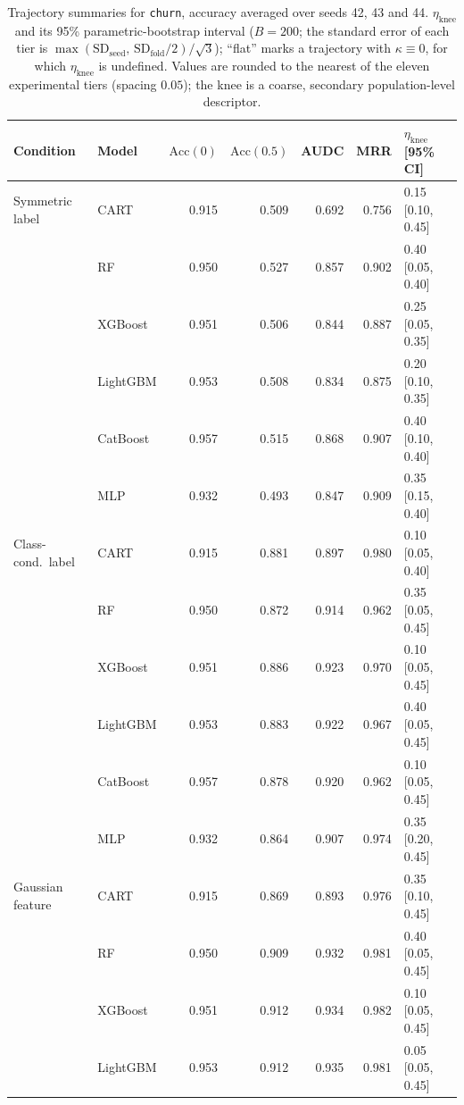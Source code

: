 \documentclass[pdflatex,sn-mathphys]{sn-jnl}
\theoremstyle{thmstyleone}
\begin{document}
\begin{table}[htbp]
\centering
\scriptsize
\setlength{\tabcolsep}{3.5pt}
\caption{Trajectory summaries for \texttt{churn}, accuracy averaged over seeds 42, 43 and 44. $\eta_{\mathrm{knee}}$ and its 95\% parametric-bootstrap interval ($B=200$; the standard error of each tier is $\max(\mathrm{SD}_{\mathrm{seed}},\,\mathrm{SD}_{\mathrm{fold}}/2)/\sqrt3$); ``flat'' marks a trajectory with $\kappa\equiv 0$, for which $\eta_{\mathrm{knee}}$ is undefined. Values are rounded to the nearest of the eleven experimental tiers (spacing $0.05$); the knee is a coarse, secondary population-level descriptor.}
\label{tab:traj_churn}
\begin{tabular}{@{}llrrrrl@{}}
\toprule
Condition & Model & $\mathrm{Acc}(0)$ & $\mathrm{Acc}(0.5)$ & AUDC & MRR & $\eta_{\mathrm{knee}}$ [95\% CI] \\
\midrule
Symmetric label & CART & 0.915 & 0.509 & 0.692 & 0.756 & 0.15 [0.10, 0.45] \\
 & RF & 0.950 & 0.527 & 0.857 & 0.902 & 0.40 [0.05, 0.40] \\
 & XGBoost & 0.951 & 0.506 & 0.844 & 0.887 & 0.25 [0.05, 0.35] \\
 & LightGBM & 0.953 & 0.508 & 0.834 & 0.875 & 0.20 [0.10, 0.35] \\
 & CatBoost & 0.957 & 0.515 & 0.868 & 0.907 & 0.40 [0.10, 0.40] \\
 & MLP & 0.932 & 0.493 & 0.847 & 0.909 & 0.35 [0.15, 0.40] \\
\midrule
Class-cond.\ label & CART & 0.915 & 0.881 & 0.897 & 0.980 & 0.10 [0.05, 0.40] \\
 & RF & 0.950 & 0.872 & 0.914 & 0.962 & 0.35 [0.05, 0.45] \\
 & XGBoost & 0.951 & 0.886 & 0.923 & 0.970 & 0.10 [0.05, 0.45] \\
 & LightGBM & 0.953 & 0.883 & 0.922 & 0.967 & 0.40 [0.05, 0.45] \\
 & CatBoost & 0.957 & 0.878 & 0.920 & 0.962 & 0.10 [0.05, 0.45] \\
 & MLP & 0.932 & 0.864 & 0.907 & 0.974 & 0.35 [0.20, 0.45] \\
\midrule
Gaussian feature & CART & 0.915 & 0.869 & 0.893 & 0.976 & 0.35 [0.10, 0.45] \\
 & RF & 0.950 & 0.909 & 0.932 & 0.981 & 0.40 [0.05, 0.45] \\
 & XGBoost & 0.951 & 0.912 & 0.934 & 0.982 & 0.10 [0.05, 0.45] \\
 & LightGBM & 0.953 & 0.912 & 0.935 & 0.981 & 0.05 [0.05, 0.45] \\

\end{tabular}
\end{table}
\end{document}
